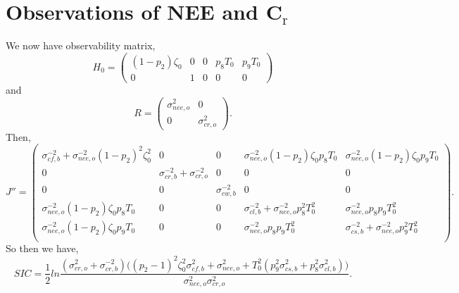 \documentclass[11pt]{article}
\begin{document}
\section*{Observations of NEE and C$_\text{r}$}
We now have observability matrix,
\[
H_{0} = \begin{pmatrix}
(1-p_{2})\zeta_0 & 0 & 0 & p_{8}T_{0} & p_{9}T_{0}\\
0 & 1 & 0 & 0 & 0
\end{pmatrix}
\]
and 
\[
R= \begin{pmatrix}
\sigma_{nee,o}^{2} & 0 \\
0 & \sigma_{cr,o}^{2}
\end{pmatrix}.
\]
Then,
\[
J'' = \begin{pmatrix}
\sigma_{cf,b}^{-2}+\sigma_{nee,o}^{-2}(1-p_{2})^{2}\zeta_0^{2} & 0 & 0 & \sigma_{nee,o}^{-2}(1-p_{2})\zeta_0 p_{8}T_0 & \sigma_{nee,o}^{-2}(1-p_{2})\zeta_0 p_{9}T_0 \\
0 & \sigma_{cr,b}^{-2}+\sigma_{cr,o}^{-2} & 0 & 0 & 0 \\
0 & 0 & \sigma_{cw,b}^{-2} & 0 & 0 \\
\sigma_{nee,o}^{-2}(1-p_{2})\zeta_0 p_{8}T_0 & 0 & 0 & \sigma_{cl,b}^{-2}+\sigma_{nee,o}^{-2}p_{8}^2 T_0^2 & \sigma_{nee,o}^{-2}p_{8}p_{9} T_0^2 \\
\sigma_{nee,o}^{-2}(1-p_{2})\zeta_0 p_{9}T_0 & 0 & 0 & \sigma_{nee,o}^{-2}p_{8}p_{9} T_0^2 & \sigma_{cs,b}^{-2}+\sigma_{nee,o}^{-2}p_{9}^2 T_0^2 \\
\end{pmatrix}.
\]
So then we have,
\[
SIC = \frac{1}{2}ln\frac{(\sigma_{cr,o}^2+\sigma_{cr,b}^{-2})\big((p_{2}-1)^{2}\zeta_0^{2}\sigma_{cf,b}^{2}+\sigma_{nee,o}^{2}+T_{0}^2(p_{9}^2\sigma_{cs,b}^2+p_8^2\sigma_{cl,b}^2)\big)}{\sigma_{nee,o}^{2}\sigma_{cr,o}^2}.
\]
\end{document}
